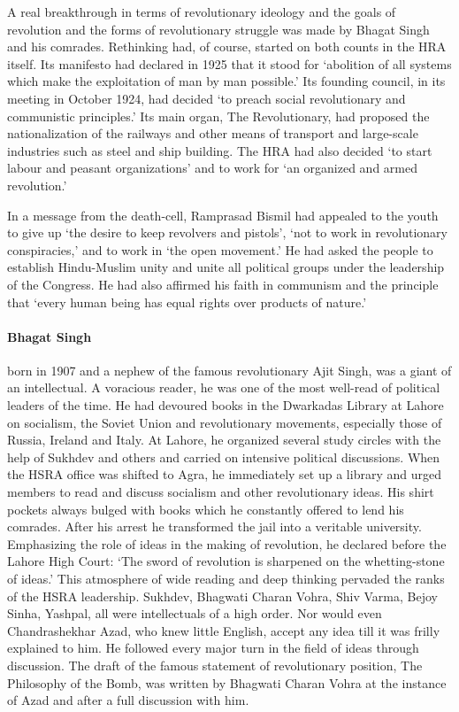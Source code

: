\begin{multicols}{2}
A real breakthrough in terms of revolutionary ideology and the goals of revolution and the forms of revolutionary struggle was made by Bhagat Singh and his comrades. Rethinking had, of course, started on both counts in the HRA itself. Its manifesto had declared in 1925 that it stood for `abolition of all systems which make the exploitation of man by man possible.' Its founding council, in its meeting in October 1924, had decided `to preach social revolutionary and communistic principles.' Its main organ, The Revolutionary, had proposed the nationalization of the railways and other means of transport and large-scale industries such as steel and ship building. The HRA had also decided `to start labour and peasant organizations' and to work for `an organized and armed revolution.'

In a message from the death-cell, Ramprasad Bismil had appealed to the youth to give up `the desire to keep revolvers and pistols', `not to work in revolutionary conspiracies,' and to work in `the open movement.' He had asked the people to establish Hindu-Muslim unity and unite all political groups under the leadership of the Congress. He had also affirmed his faith in communism and the principle that `every human being has equal rights over products of nature.'

\paragraph{Bhagat Singh} born in 1907 and a nephew of the famous revolutionary Ajit Singh, was a giant of an intellectual. A voracious reader, he was one of the most well-read of political leaders of the time. He had devoured books in the Dwarkadas Library at Lahore on socialism, the Soviet Union and revolutionary movements, especially those of Russia, Ireland and Italy. At Lahore, he organized several study circles with the help of Sukhdev and others and carried on intensive political discussions. When the HSRA office was shifted to Agra, he immediately set up a library and urged members to read and discuss socialism and other revolutionary ideas. His shirt pockets always bulged with books which he constantly offered to lend his comrades. After his arrest he transformed the jail into a veritable university. Emphasizing the role of ideas in the making of revolution, he declared before the Lahore High Court: `The sword of revolution is sharpened on the whetting-stone of ideas.' This atmosphere of wide reading and deep thinking pervaded the ranks of the HSRA leadership. Sukhdev, Bhagwati Charan Vohra, Shiv Varma, Bejoy Sinha, Yashpal, all were intellectuals of a high order. Nor would even Chandrashekhar Azad, who knew little English, accept any idea till it was frilly explained to him. He followed every major turn in the field of ideas through discussion. The draft of the famous statement of revolutionary position, The Philosophy of the Bomb, was written by Bhagwati Charan Vohra at the instance of Azad and after a full discussion with him.


\end{multicols}
